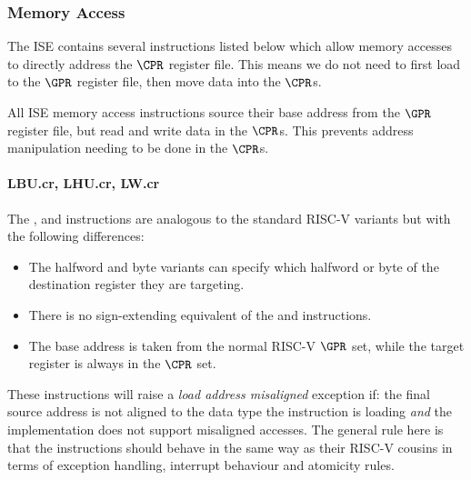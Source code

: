 \subsubsection{Memory Access}

The ISE contains several instructions listed below which allow memory
accesses to directly address the $\CPR$ register file. This means we do
not need to first load to the $\GPR$ register file, then move data into
the $\CPR$s.

All ISE memory access instructions source their base address from the
$\GPR$ register file, but read and write data in the $\CPR$s. This
prevents address manipulation needing to be done in the $\CPR$s.


\paragraph{LBU.cr, LHU.cr, LW.cr}

The ,  and  instructions are analogous to
the standard RISC-V variants but with the following differences:

\begin{itemize}
\item The halfword and byte variants can specify which halfword or byte of
      the destination register they are targeting.
\item There is no sign-extending equivalent of the  and 
      instructions.
\item The base address is taken from the normal RISC-V $\GPR$ set, while the
      target register is always in the $\CPR$ set.
\end{itemize}

These instructions will raise a {\em load address misaligned} exception
if: the final source address is not aligned to the data type the instruction
is loading {\em and} the implementation does not support misaligned accesses.
The general rule here is that the  instructions should behave in
the same way as their RISC-V cousins in terms of exception handling,
interrupt behaviour and atomicity rules.

